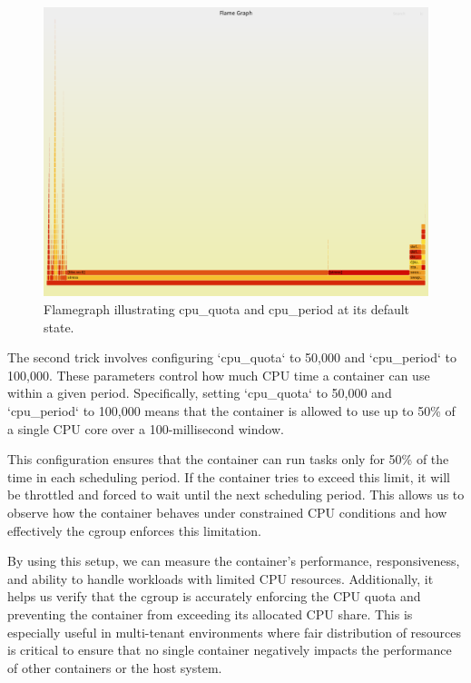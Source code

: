 \documentclass{report}  %
\begin{document}
\begin{figure}[H]
    \centering
    \includegraphics[width=\textwidth]{cpu_tricks/6.5.5/V1/flamegraph_20241017_092801.png}
    \caption{Flamegraph illustrating cpu\_quota and cpu\_period at its default state.}
    \label{fig:flamegraph}
\end{figure}


\large{
  The second trick involves configuring `cpu\_quota` to 50,000 and `cpu\_period` to 100,000. These parameters control how much CPU time a container can use within a given period. Specifically, setting `cpu\_quota` to 50,000 and `cpu\_period` to 100,000 means that the container is allowed to use up to 50\% of a single CPU core over a 100-millisecond window.

  This configuration ensures that the container can run tasks only for 50\% of the time in each scheduling period. If the container tries to exceed this limit, it will be throttled and forced to wait until the next scheduling period. This allows us to observe how the container behaves under constrained CPU conditions and how effectively the cgroup enforces this limitation.

  By using this setup, we can measure the container’s performance, responsiveness, and ability to handle workloads with limited CPU resources. Additionally, it helps us verify that the cgroup is accurately enforcing the CPU quota and preventing the container from exceeding its allocated CPU share. This is especially useful in multi-tenant environments where fair distribution of resources is critical to ensure that no single container negatively impacts the performance of other containers or the host system.
}
\end{document}
